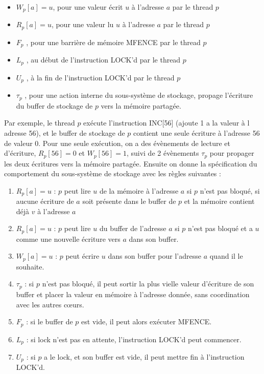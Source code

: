 \documentclass[12pt,a4paper]{article}
\begin{document}
\begin{itemize}
	\item $W_p[a]=u$, pour une valeur écrit $u$ à l'adresse $a$ par le thread $p$	
	\item $R_p[a]=u$, pour une valeur lu $u$ à l'adresse $a$ par le thread $p$
	\item $F_p$ , pour une barrière de mémoire MFENCE par le thread $p$
	\item $L_p$ , au début de l'instruction LOCK'd par le thread $p$
	\item $U_p$ , à la fin de l'instruction LOCK'd par le thread $p$
	\item $\tau_p$ , pour une action interne du sous-système de stockage, propage l'écriture du buffer de stockage de $p$ vers la mémoire partagée.
\end{itemize}

Par exemple, le thread $p$ exécute l'instruction INC[56] (ajoute 1 a la valeur à l adresse 56), et le buffer de stockage de $p$ contient une seule écriture à l'adresse 56 de valeur 0. Pour une seule exécution, on a des évènements de lecture et d'écriture, $R_p[56] = 0$ et $W_p[56] = 1$, suivi de 2 évènements $\tau_p$ pour propager les deux écritures vers la mémoire partagée.
Ensuite on donne la spécification du comportement du sous-système de stockage avec les règles suivantes :
\begin{enumerate}
	\item $R_p[a] = u$ : $p$ peut lire $u$ de la mémoire à l'adresse $a$ si $p$ n'est pas bloqué, si aucune écriture de $a$ soit présente dans le buffer de $p$ et la mémoire contient déjà $v$ à l'adresse $a$
	\item $R_p[a] = u$ : $p$ peut lire $u$ du buffer de l'adresse $a$ si $p$ n'est pas bloqué et a $u$ comme une nouvelle écriture vers $a$ dans son buffer.
	\item $W_p[a] = u$ : $p$ peut écrire $u$ dans son buffer pour l'adresse $a$ quand il le souhaite.
	\item $\tau_p$ : si $p$ n'est pas bloqué, il peut sortir la plus vielle valeur d'écriture de son buffer et placer la valeur en mémoire à l'adresse donnée, sans coordination avec les autres cœurs.
	\item $F_p$ : si le buffer de $p$ est vide, il peut alors exécuter MFENCE.
	\item $L_p$ : si lock n'est pas en attente, l'instruction LOCK'd peut commencer.
	\item $U_p$ : si $p$ a le lock, et son buffer est vide, il peut mettre fin à l'instruction LOCK'd.
\end{enumerate}
\end{document}
